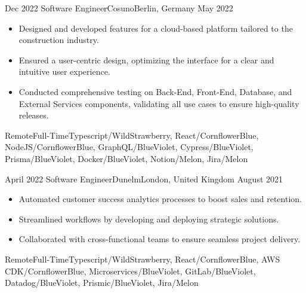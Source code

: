 \begin{experiences}
  \emptySeparator

  \experience
  {Dec 2022} {Software Engineer}{Cosuno}{Berlin, Germany}
  {May 2022}{\begin{itemize}
    \item Designed and developed features for a cloud-based platform tailored to the construction industry.
    \item Ensured a user-centric design, optimizing the interface for a clear and intuitive user experience.
    \item Conducted comprehensive testing on Back-End, Front-End, Database, and External Services components, validating all use cases to ensure high-quality releases.
  \end{itemize}}
  {Remote}{Full-Time}{Typescript/WildStrawberry, React/CornflowerBlue, NodeJS/CornflowerBlue, GraphQL/BlueViolet, Cypress/BlueViolet, Prisma/BlueViolet, Docker/BlueViolet, Notion/Melon, Jira/Melon}

  \emptySeparator

  \experience
  {April 2022} {Software Engineer}{Dunelm}{London, United Kingdom}
  {August 2021}{\begin{itemize}
    \item Automated customer success analytics processes to boost sales and retention.
    \item Streamlined workflows by developing and deploying strategic solutions.
    \item Collaborated with cross-functional teams to ensure seamless project delivery.
  \end{itemize}}
  {Remote}{Full-Time}{Typescript/WildStrawberry, React/CornflowerBlue, AWS CDK/CornflowerBlue, Microservices/BlueViolet, GitLab/BlueViolet, Datadog/BlueViolet, Prismic/BlueViolet, Jira/Melon}

\end{experiences}